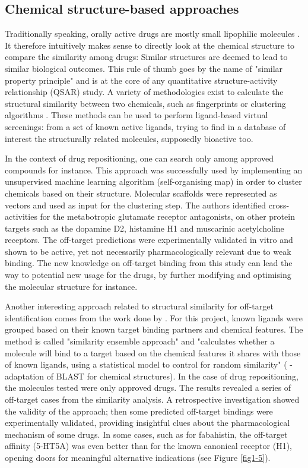 \subsection{Chemical structure-based approaches}

Traditionally speaking, orally active drugs are mostly small lipophilic molecules \citep{lipinski1997experimental}. It therefore intuitively makes sense to directly look at the chemical structure to compare the similarity among drugs: Similar structures are deemed to lead to similar biological outcomes. This rule of thumb goes by the name of "similar property principle" \citep{johnson1990concepts} and is at the core of any quantitative structure-activity relationship (QSAR) study. A variety of methodologies exist to calculate the structural similarity between two chemicals, such as fingerprints or clustering algorithms \citep{eckert2007molecular}. These methods can be used to perform ligand-based virtual screenings: from a set of known active ligands, trying to find in a database of interest the structurally related molecules, supposedly bioactive too.

In the context of drug repositioning, one can search only among approved compounds for instance. This approach was successfully used by \cite{noeske2006predicting} implementing an unsupervised machine learning algorithm (self-organising map) in order to cluster chemicals based on their structure. Molecular scaffolds were represented as vectors and used as input for the clustering step. The authors identified cross-activities for the metabotropic glutamate receptor antagonists, on other protein targets such as the dopamine D2, histamine H1 and muscarinic acetylcholine receptors. The off-target predictions were experimentally validated in vitro and shown to be active, yet not necessarily pharmacologically relevant due to weak binding. The new knowledge on off-target binding from this study can lead the way to potential new usage for the drugs, by further modifying and optimising the molecular structure for instance.

Another interesting approach related to structural similarity for off-target identification comes from the work done by \citep{keiser2009predicting}. For this project, known ligands were grouped based on their known target binding partners and chemical features. The method is called "similarity ensemble approach" and "calculates whether a molecule will bind to a target based on the chemical features it shares with those of known ligands, using a statistical model to control for random similarity" (\cite{lounkine2012large} - adaptation of BLAST for chemical structures). In the case of drug repositioning, the molecules tested were only approved drugs. The results revealed a series of off-target cases from the similarity analysis. A retrospective investigation showed the validity of the approach; then some predicted off-target bindings were experimentally validated, providing insightful clues about the pharmacological mechanism of some drugs. In some cases, such as for fabahistin, the off-target affinity (5-HT5A) was even better than for the known canonical receptor (H1), opening doors for meaningful alternative indications (see Figure \ref{fig1-5}).

